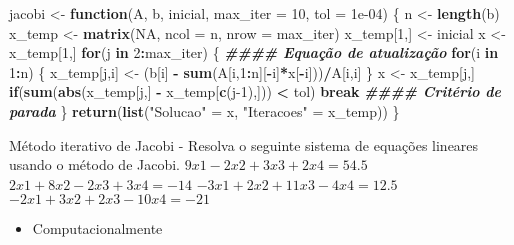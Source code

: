 \documentclass[
]{article}
\newenvironment{Shaded}{\begin{snugshade}}{\end{snugshade}}
\newcommand{\AttributeTok}[1]{\textcolor[rgb]{0.13,0.29,0.53}{#1}}
\newcommand{\ConstantTok}[1]{\textcolor[rgb]{0.56,0.35,0.01}{#1}}
\newcommand{\ControlFlowTok}[1]{\textcolor[rgb]{0.13,0.29,0.53}{\textbf{#1}}}
\newcommand{\DecValTok}[1]{\textcolor[rgb]{0.00,0.00,0.81}{#1}}
\newcommand{\DocumentationTok}[1]{\textcolor[rgb]{0.56,0.35,0.01}{\textbf{\textit{#1}}}}
\newcommand{\FloatTok}[1]{\textcolor[rgb]{0.00,0.00,0.81}{#1}}
\newcommand{\FunctionTok}[1]{\textcolor[rgb]{0.13,0.29,0.53}{\textbf{#1}}}
\newcommand{\NormalTok}[1]{#1}
\newcommand{\OtherTok}[1]{\textcolor[rgb]{0.56,0.35,0.01}{#1}}
\newcommand{\SpecialCharTok}[1]{\textcolor[rgb]{0.81,0.36,0.00}{\textbf{#1}}}
\newcommand{\StringTok}[1]{\textcolor[rgb]{0.31,0.60,0.02}{#1}}
\providecommand{\tightlist}{%
  \setlength{\itemsep}{0pt}\setlength{\parskip}{0pt}}
\begin{document}
\begin{Shaded}
\begin{Highlighting}[]
\NormalTok{jacobi }\OtherTok{\textless{}{-}} \ControlFlowTok{function}\NormalTok{(A, b, inicial, }\AttributeTok{max\_iter =} \DecValTok{10}\NormalTok{, }\AttributeTok{tol =} \FloatTok{1e{-}04}\NormalTok{) \{}
\NormalTok{n }\OtherTok{\textless{}{-}} \FunctionTok{length}\NormalTok{(b)}
\NormalTok{x\_temp }\OtherTok{\textless{}{-}} \FunctionTok{matrix}\NormalTok{(}\ConstantTok{NA}\NormalTok{, }\AttributeTok{ncol =}\NormalTok{ n, }\AttributeTok{nrow =}\NormalTok{ max\_iter)}
\NormalTok{x\_temp[}\DecValTok{1}\NormalTok{,] }\OtherTok{\textless{}{-}}\NormalTok{ inicial}
\NormalTok{x }\OtherTok{\textless{}{-}}\NormalTok{ x\_temp[}\DecValTok{1}\NormalTok{,]}
\ControlFlowTok{for}\NormalTok{(j }\ControlFlowTok{in} \DecValTok{2}\SpecialCharTok{:}\NormalTok{max\_iter) \{ }\DocumentationTok{\#\#\#\# Equação de atualização}
\ControlFlowTok{for}\NormalTok{(i }\ControlFlowTok{in} \DecValTok{1}\SpecialCharTok{:}\NormalTok{n) \{}
\NormalTok{x\_temp[j,i] }\OtherTok{\textless{}{-}}\NormalTok{ (b[i] }\SpecialCharTok{{-}} \FunctionTok{sum}\NormalTok{(A[i,}\DecValTok{1}\SpecialCharTok{:}\NormalTok{n][}\SpecialCharTok{{-}}\NormalTok{i]}\SpecialCharTok{*}\NormalTok{x[}\SpecialCharTok{{-}}\NormalTok{i]))}\SpecialCharTok{/}\NormalTok{A[i,i]}
\NormalTok{\}}
\NormalTok{x }\OtherTok{\textless{}{-}}\NormalTok{ x\_temp[j,]}
\ControlFlowTok{if}\NormalTok{(}\FunctionTok{sum}\NormalTok{(}\FunctionTok{abs}\NormalTok{(x\_temp[j,] }\SpecialCharTok{{-}}\NormalTok{ x\_temp[}\FunctionTok{c}\NormalTok{(j}\DecValTok{{-}1}\NormalTok{),])) }\SpecialCharTok{\textless{}}\NormalTok{ tol) }\ControlFlowTok{break} \DocumentationTok{\#\#\#\# Critério de parada}
\NormalTok{\}}
\FunctionTok{return}\NormalTok{(}\FunctionTok{list}\NormalTok{(}\StringTok{"Solucao"} \OtherTok{=}\NormalTok{ x, }\StringTok{"Iteracoes"} \OtherTok{=}\NormalTok{ x\_temp))}
\NormalTok{\}}
\end{Highlighting}
\end{Shaded}

Método iterativo de Jacobi - Resolva o seguinte sistema de equações
lineares usando o método de Jacobi. \(9x 1 - 2x 2 + 3x 3 + 2x 4 = 54.5\)
\(2x 1 + 8x 2 - 2x 3 + 3x 4 = -14\)
\(-3x 1 + 2x 2 + 11x 3 - 4x 4 = 12.5\)
\(-2x 1 + 3x 2 + 2x 3 - 10x 4 = -21\)

\begin{itemize}
\tightlist
\item
  Computacionalmente
\end{itemize}
\end{document}
